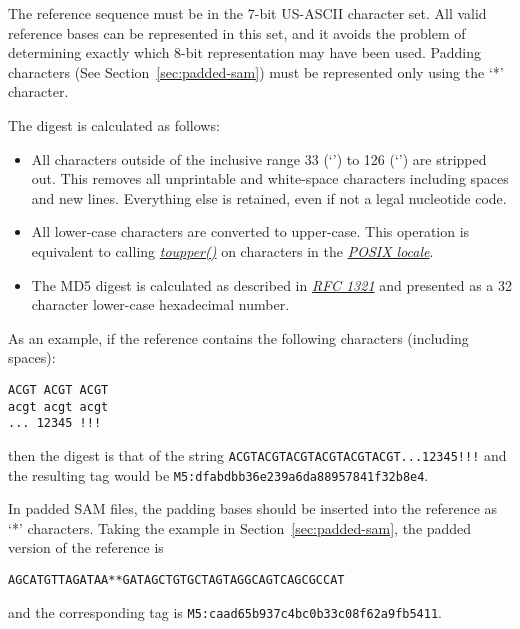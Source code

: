 \documentclass[10pt]{article}
\begin{document}
The reference sequence must be in the 7-bit US-ASCII character set.
All valid reference bases can be represented in this set, and it avoids the problem of determining exactly which 8-bit representation may have been used.
Padding characters (See Section~\ref{sec:padded-sam}) must be represented only using the `*' character. 

The digest is calculated as follows:
\begin{itemize}
\item All characters outside of the inclusive range 33 (`') to 126 (`') are stripped out.
This removes all unprintable and white-space characters including spaces and new lines.
Everything else is retained, even if not a legal nucleotide code.
\item All lower-case characters are converted to upper-case.
This operation is equivalent to calling \href{http://pubs.opengroup.org/onlinepubs/9699919799/functions/toupper.html}{\sl toupper()} on characters in the \href{http://pubs.opengroup.org/onlinepubs/9699919799/basedefs/V1\_chap07.html\#tag\_07\_02}{\sl POSIX locale}.
\item The MD5 digest is calculated as described in \href{https://tools.ietf.org/html/rfc1321}{\sl RFC 1321} and presented as a 32 character lower-case hexadecimal number.
\end{itemize}

As an example, if the reference contains the following characters (including spaces):
\begin{verbatim}
ACGT ACGT ACGT
acgt acgt acgt
... 12345 !!!
\end{verbatim}
then the digest is that of the string {\tt ACGTACGTACGTACGTACGTACGT...12345!!!}
and the resulting tag would be {\tt M5:dfabdbb36e239a6da88957841f32b8e4}.

In padded SAM files, the padding bases should be inserted into the reference as `*' characters.
Taking the example in Section~\ref{sec:padded-sam}, the padded version of the reference is
\begin{verbatim}
AGCATGTTAGATAA**GATAGCTGTGCTAGTAGGCAGTCAGCGCCAT
\end{verbatim}
and the corresponding tag is {\tt M5:caad65b937c4bc0b33c08f62a9fb5411}.
\end{document}
